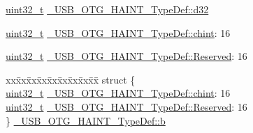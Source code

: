\begin{DoxyCompactItemize}
\begin{tabbing}
\end{tabbing}\item 
\hyperlink{stdint_8h_a435d1572bf3f880d55459d9805097f62}{uint32\-\_\-t} \hyperlink{group___u_s_b___o_t_g___d_r_i_v_e_r_gaf31801d9033db4be2c72b0ca2f2f017b}{\-\_\-\-U\-S\-B\-\_\-\-O\-T\-G\-\_\-\-H\-A\-I\-N\-T\-\_\-\-Type\-Def\-::d32}
\item 
\hyperlink{stdint_8h_a435d1572bf3f880d55459d9805097f62}{uint32\-\_\-t} \hyperlink{group___u_s_b___o_t_g___d_r_i_v_e_r_gaa5b226912e64d070153feb7a20f3ffa5}{\-\_\-\-U\-S\-B\-\_\-\-O\-T\-G\-\_\-\-H\-A\-I\-N\-T\-\_\-\-Type\-Def\-::chint}\-: 16
\item 
\hyperlink{stdint_8h_a435d1572bf3f880d55459d9805097f62}{uint32\-\_\-t} \hyperlink{group___u_s_b___o_t_g___d_r_i_v_e_r_ga9c409040b625226f65c1c50cf02772fb}{\-\_\-\-U\-S\-B\-\_\-\-O\-T\-G\-\_\-\-H\-A\-I\-N\-T\-\_\-\-Type\-Def\-::\-Reserved}\-: 16
\item 
\begin{tabbing}
xx\=xx\=xx\=xx\=xx\=xx\=xx\=xx\=xx\=\kill
struct \{\\
\>\hyperlink{stdint_8h_a435d1572bf3f880d55459d9805097f62}{uint32\_t} \hyperlink{group___u_s_b___o_t_g___d_r_i_v_e_r_gaa5b226912e64d070153feb7a20f3ffa5}{\_USB\_OTG\_HAINT\_TypeDef::chint}: 16\\
\>\hyperlink{stdint_8h_a435d1572bf3f880d55459d9805097f62}{uint32\_t} \hyperlink{group___u_s_b___o_t_g___d_r_i_v_e_r_ga9c409040b625226f65c1c50cf02772fb}{\_USB\_OTG\_HAINT\_TypeDef::Reserved}: 16\\
\} \hyperlink{group___u_s_b___o_t_g___d_r_i_v_e_r_ga8e2e7c8a17595d15fc874ba69dbf690d}{\_USB\_OTG\_HAINT\_TypeDef::b}\\


\end{tabbing}
\end{DoxyCompactItemize}
